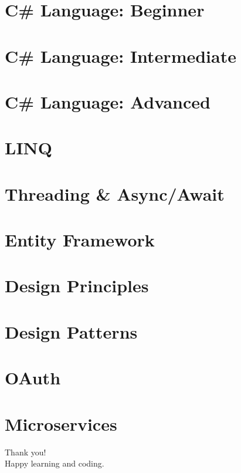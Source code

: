 \documentclass{mybeamer}
\begin{document}
\hypertarget{sec1}{}
\section{C\# Language: Beginner}


\hypertarget{sec2}{}
\section{C\# Language: Intermediate}


\hypertarget{sec3}{}
\section{C\# Language: Advanced}


\hypertarget{sec4}{}
\section{LINQ}


\hypertarget{sec5}{}
\section{Threading \& Async/Await}


\hypertarget{sec6}{}
\section{Entity Framework}


\hypertarget{sec7}{}
\section{Design Principles}


\hypertarget{sec8}{}
\section{Design Patterns}


\hypertarget{sec9}{}
\section{OAuth}


\hypertarget{sec10}{}
\section{Microservices}


\begin{frame}
  \centering
  {\Huge Thank you!}\\[0.5em]
  Happy learning and coding.
\end{frame}
\end{document}
